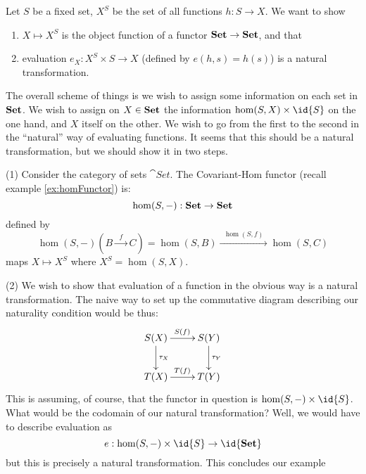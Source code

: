 \begin{ex}\label{ex:naturalTransformation}
Let $S$ be a fixed set, $X^{S}$ be the set of all functions
$h:S\to X$. We want to show
\begin{enumerate}
\item $X\mapsto X^{S}$ is the object function of a functor
  $\mathbf{Set}\to\mathbf{Set}$, and that
\item evaluation $e_{X}:X^{S}\times S\to X$ (defined by
  $e(h,s)=h(s)$) is a natural transformation.
\end{enumerate}
The overall scheme of things is we wish to assign some
information on each set in $\mathbf{Set}$. We wish to assign on
$X\in\mathbf{Set}$ the information $\hom(S,X)\times\id{S}$ on the one
hand, and $X$ itself on the other. We wish to go from the first
to the second in the ``natural'' way of evaluating functions. It
seems that this should be a natural transformation, but we should
show it in two steps.

(1) Consider the category of sets $\cat{Set}$. The Covariant-Hom
functor (recall example \ref{ex:homFunctor}) is:
\begin{equation}%
\hom(S,-):\ms{Set}\to\ms{Set}
\end{equation}
defined by
\begin{equation}%
\hom(S,-)\left(B\xrightarrow{\;\;f\;\;}C\right)=\hom(S,B)\xrightarrow{\;\;\hom(S,f)\;\;}\hom(S,C)
\end{equation}
maps $X\mapsto X^{S}$ where $X^{S}=\hom(S,X)$.

\noindent(2) We wish to show that evaluation of a function in the
obvious way is a natural transformation. The naive way to set up
the commutative diagram describing our naturality condition would
be thus:
\begin{equation}
\vcenter{
\xymatrix{
S(X)\ar[d]^{\tau_{X}} \ar[r]^{S(f)} & S(Y)\ar[d]^{\tau_{Y}}\\
T(X)\ar[r]^{T(f)} & T(Y)
}}
\end{equation}
\noindent This is assuming, of course, that the functor in
question is $\hom(S,-)\times\id{S}$. What would be the codomain
of our natural transformation? Well, we would have to describe
evaluation as
\begin{equation}%
e:\hom(S,-)\times\id{S}\to\id{\ms{Set}}
\end{equation}
but this is precisely a natural transformation. This concludes
our example
\end{ex}

